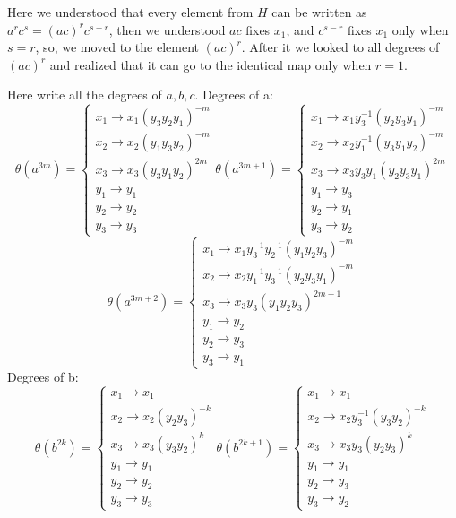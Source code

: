 \documentclass{article}
\begin{document}
Here we understood that every element from $H$ can be written as $a^rc^s=(ac)^rc^{s-r}$, then we understood $ac$ fixes $x_1$, and $c^{s-r}$ fixes $x_1$ only when $s=r$, so, we moved to the element $(ac)^r$. After it we looked to all degrees of $(ac)^r$ and realized that it can go to the identical map only when $r=1$. 

Here write all the degrees of $a,b,c$.
Degrees of a:
$$
\theta(a^{3m}) =
\begin{cases}
	x_1 \rightarrow x_1 (y_3 y_2 y_1)^{-m}\\
	x_2 \rightarrow x_2 (y_1 y_3 y_2)^{-m}\\
	x_3 \rightarrow x_3 (y_3 y_1 y_2)^{2m}\\
	y_1 \rightarrow y_1\\
	y_2 \rightarrow y_2\\
	y_3 \rightarrow y_3
\end{cases}
\theta(a^{3m+1}) =
\begin{cases}
	x_1 \rightarrow x_1 y_3^{-1} (y_2 y_3 y_1)^{-m}\\
	x_2 \rightarrow x_2 y_1^{-1} (y_3 y_1 y_2)^{-m}\\
	x_3 \rightarrow x_3 y_3 y_1 (y_2 y_3 y_1)^{2m}\\
	y_1 \rightarrow y_3\\
	y_2 \rightarrow y_1\\
	y_3 \rightarrow y_2
\end{cases} 
$$ 
$$
\theta(a^{3m+2}) =
\begin{cases}
	x_1 \rightarrow x_1 y_3^{-1}y_2^{-1} (y_1 y_2 y_3)^{-m}\\
	x_2 \rightarrow x_2 y_1^{-1}y_3^{-1} (y_2 y_3 y_1)^{-m}\\
	x_3 \rightarrow x_3 y_3 (y_1 y_2y_3)^{2m+1}\\
	y_1 \rightarrow y_2\\
	y_2 \rightarrow y_3\\
	y_3 \rightarrow y_1
\end{cases}
$$
Degrees of b:
$$
\theta(b^{2k}) =
\begin{cases}
	x_1 \rightarrow x_1\\
	x_2 \rightarrow x_2 (y_2 y_3)^{-k}\\
	x_3 \rightarrow x_3 (y_3 y_2)^k\\
	y_1 \rightarrow y_1\\
	y_2 \rightarrow y_2\\
	y_3 \rightarrow y_3
\end{cases} 
\theta(b^{2k+1}) =
\begin{cases}
	x_1 \rightarrow x_1 \\
	x_2 \rightarrow x_2 y_3^{-1} (y_3 y_2)^{-k}\\
	x_3 \rightarrow x_3 y_3 (y_2 y_3)^k\\
	y_1 \rightarrow y_1\\
	y_2 \rightarrow y_3\\
	y_3 \rightarrow y_2
\end{cases}
$$
\end{document}
